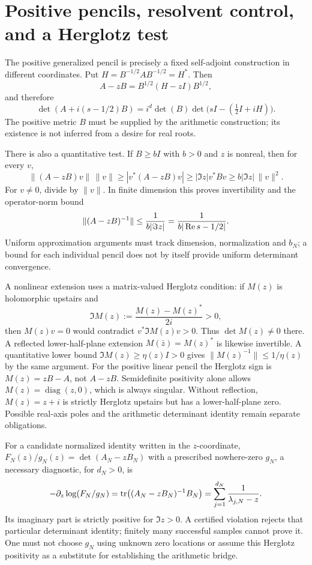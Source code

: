 \section{Positive pencils, resolvent control, and a Herglotz test}
The positive generalized pencil is precisely a fixed self-adjoint
construction in different coordinates. Put $H=B^{-1/2}AB^{-1/2}=H^*$.
Then
\[
 A-zB=B^{1/2}(H-zI)B^{1/2},
\]
and therefore
\[
 \det(A+i(s-1/2)B)=i^d\det(B)
 \det\bigl(sI-(\tfrac12I+iH)\bigr).
\]
The positive metric $B$ must be supplied by the arithmetic construction;
its existence is not inferred from a desire for real roots.

There is also a quantitative test. If $B\ge bI$ with $b>0$ and $z$ is
nonreal, then for every $v$,
\[
 \|(A-zB)v\|\,\|v\|\ge |v^*(A-zB)v|
 \ge |\Im z|v^*Bv\ge b|\Im z|\,\|v\|^2.
\]
For $v\ne0$, divide by $\|v\|$. In finite dimension this proves
invertibility and the operator-norm bound
\[
 \|(A-zB)^{-1}\|\le\frac1{b|\Im z|}
 =\frac1{b|\operatorname{Re} s-1/2|}.
\]
Uniform approximation arguments must track dimension, normalization and
$b_N$; a bound for each individual pencil does not by itself provide
uniform determinant convergence.

A nonlinear extension uses a matrix-valued Herglotz condition: if $M(z)$
is holomorphic upstairs and
\[
 \Im M(z):=\frac{M(z)-M(z)^*}{2i}>0,
\]
then $M(z)v=0$ would contradict $v^*\Im M(z)v>0$. Thus $\det M(z)\ne0$
there. A reflected lower-half-plane extension
$M(\bar z)=M(z)^*$ is likewise invertible. A quantitative lower bound
$\Im M(z)\ge\eta(z)I>0$ gives $\|M(z)^{-1}\|\le1/\eta(z)$ by the
same argument. For the positive linear pencil the Herglotz sign is
$M(z)=zB-A$, not $A-zB$.
Semidefinite positivity alone allows $M(z)=\operatorname{diag}(z,0)$,
which is always singular. Without reflection, $M(z)=z+i$ is strictly
Herglotz upstairs but has a lower-half-plane zero. Possible real-axis
poles and the arithmetic determinant identity remain separate obligations.

For a candidate normalized identity written in the $z$-coordinate,
$F_N(z)/g_N(z)=\det(A_N-zB_N)$ with a prescribed nowhere-zero $g_N$,
a necessary diagnostic, for $d_N>0$, is
\[
 -\partial_z\log(F_N/g_N)
 =\operatorname{tr}\bigl((A_N-zB_N)^{-1}B_N\bigr)
 =\sum_{j=1}^{d_N}\frac1{\lambda_{j,N}-z}.
\]
Its imaginary part is strictly positive for $\Im z>0$.
A certified violation rejects that particular determinant identity;
finitely many successful samples cannot prove it. One must not choose
$g_N$ using unknown zero locations or assume this Herglotz positivity as
a substitute for establishing the arithmetic bridge.

